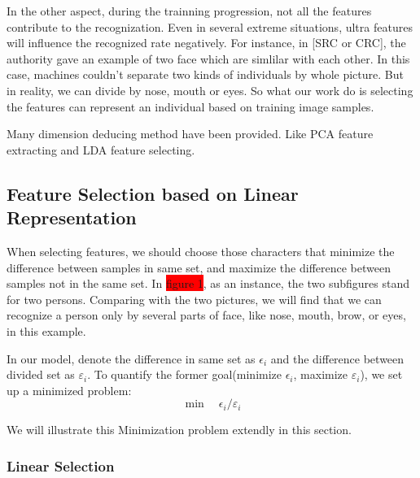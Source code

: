 \documentclass[10pt,journal,final,twocolumn,]{IEEEtran}
\begin{document}
	In the other aspect, during the trainning progression, not all the features contribute to the recognization. Even in several extreme situations, ultra features will influence the recognized rate negatively. For instance, in [SRC or CRC], the authority gave an example of two face which are simlilar with each other. In this case, machines couldn't separate two kinds of individuals by whole picture. But in reality, we can divide by nose, mouth or eyes. So what our work do is selecting the features can represent an individual based on training image samples. 
	
	Many dimension deducing method have been provided. Like PCA feature extracting and LDA feature selecting.  
	
	\subsection{Feature Selection based on Linear Representation}
	When selecting features, we should choose those characters that minimize the difference between samples in same set, and maximize the difference between samples not in the same set. In {\colorbox{red}{figure 1}}, as an instance, the two subfigures stand for two persons. Comparing with the two pictures, we will find that we can recognize a person only by several parts of face, like nose, mouth, brow, or eyes, in this example. 
	
	In our model, denote the difference in same set as $\epsilon_{i}$ and the difference between divided set as $\varepsilon_{i}$. To quantify the former goal(minimize $\epsilon_{i}$, maximize $\varepsilon_{i}$), we set up a minimized problem:
	\begin{equation}
	\min \quad{\epsilon_{i}}/{\varepsilon_{i}}
	\end{equation} 
	
	We will illustrate this Minimization problem extendly in this section.\\
	
	
	\subsubsection{\textbf{Linear Selection}}
	
\end{document}
